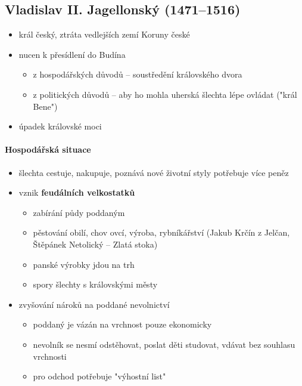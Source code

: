 \subsection{Vladislav II. Jagellonský (1471--1516)}
\begin{itemize}
\item král český, ztráta vedlejších zemí Koruny české
\item {} \ra nucen k přesídlení do Budína
	\begin{itemize}
	\item z hospodářských důvodů -- soustředění královského dvora
	\item z politických důvodů -- aby ho mohla uherská šlechta lépe ovládat ("král Bene")
	\end{itemize}
\item[\ra] úpadek královské moci
\end{itemize}

\paragraph{Hospodářská situace}
\begin{itemize}
\item šlechta cestuje, nakupuje, poznává nové životní styly \ra potřebuje více peněz
\item[\ra] vznik \textbf{feudálních velkostatků}
	\begin{itemize}
	\item zabírání půdy poddaným
	\item pěstování obilí, chov ovcí, výroba, rybníkářství (Jakub Krčín z Jelčan, Štěpánek Netolický -- Zlatá stoka)
	\item[\ra] panské výrobky jdou na trh
	\item spory šlechty s královskými městy
	\end{itemize}
\item zvyšování nároků na poddané \ra nevolnictví
	\begin{itemize}
	\item poddaný je vázán na vrchnost pouze ekonomicky
	\item nevolník se nesmí odstěhovat, poslat děti studovat, vdávat bez souhlasu vrchnosti
	\item pro odchod potřebuje "výhostní list"
	\end{itemize}
\end{itemize}

